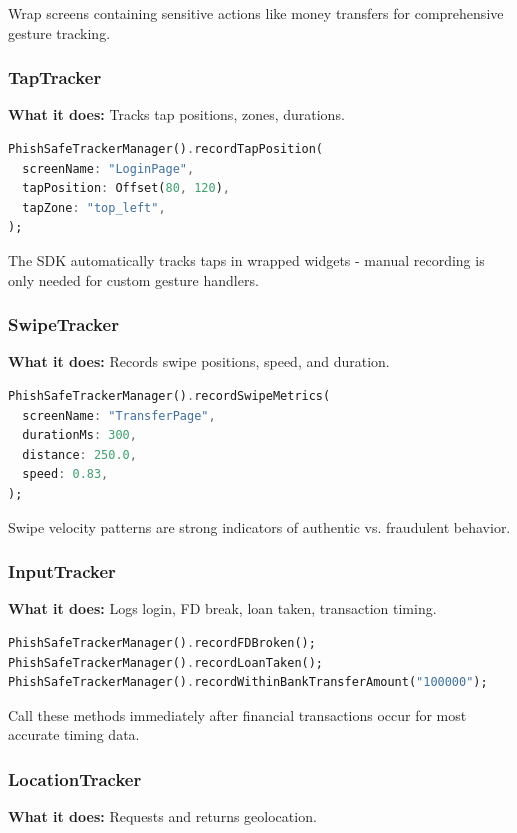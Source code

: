 \documentclass[11pt]{article}
\begin{document}
Wrap screens containing sensitive actions like money transfers for comprehensive gesture tracking.

\subsubsection{TapTracker}
\textbf{What it does:} Tracks tap positions, zones, durations.

\begin{lstlisting}[language=Dart]
PhishSafeTrackerManager().recordTapPosition(
  screenName: "LoginPage",
  tapPosition: Offset(80, 120),
  tapZone: "top_left",
);
\end{lstlisting}

The SDK automatically tracks taps in wrapped widgets - manual recording is only needed for custom gesture handlers.

\subsubsection{SwipeTracker}
\textbf{What it does:} Records swipe positions, speed, and duration.

\begin{lstlisting}[language=Dart]
PhishSafeTrackerManager().recordSwipeMetrics(
  screenName: "TransferPage",
  durationMs: 300,
  distance: 250.0,
  speed: 0.83,
);
\end{lstlisting}

Swipe velocity patterns are strong indicators of authentic vs. fraudulent behavior.

\subsubsection{InputTracker}
\textbf{What it does:} Logs login, FD break, loan taken, transaction timing.

\begin{lstlisting}[language=Dart]
PhishSafeTrackerManager().recordFDBroken();
PhishSafeTrackerManager().recordLoanTaken();
PhishSafeTrackerManager().recordWithinBankTransferAmount("100000");
\end{lstlisting}

Call these methods immediately after financial transactions occur for most accurate timing data.

\subsubsection{LocationTracker}
\textbf{What it does:} Requests and returns geolocation.
\end{document}
